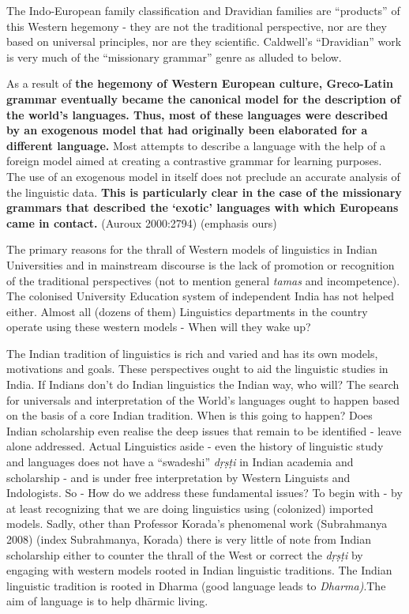 The Indo-European family classification and Dravidian families are “products” of this Western hegemony - they are not the traditional perspective, nor are they based on universal principles, nor are they scientific. Caldwell’s “Dravidian” work is very much of the “missionary grammar” genre as alluded to below.

\begin{myquote}
As a result of \textbf{the hegemony of Western European culture, Greco-Latin grammar eventually became the canonical model for the description of the world’s languages. Thus, most of these languages were described by an exogenous model that had originally been elaborated for a different language.} Most attempts to describe a language with the help of a foreign model aimed at creating a contrastive grammar for learning purposes. The use of an exogenous model in itself does not preclude an accurate analysis of the linguistic data. \textbf{This is particularly clear in the case of the missionary grammars that described the ‘exotic’ languages with which Europeans came in contact.} (Auroux 2000:2794) (emphasis ours)
\end{myquote}

The primary reasons for the thrall of Western models of linguistics in Indian Universities and in mainstream discourse is the lack of promotion or recognition of the traditional perspectives (not to mention general \textit{tamas} and incompetence). The colonised University Education system of independent India has not helped either. Almost all (dozens of them) Linguistics departments in the country operate using these western models - When will they wake up?

The Indian tradition of linguistics is rich and varied and has its own models, motivations and goals. These perspectives ought to aid the linguistic studies in India. If Indians don’t do Indian linguistics the Indian way, who will? The search for universals and interpretation of the World’s languages ought to happen based on the basis of a core Indian tradition. When is this going to happen? Does Indian scholarship even realise the deep issues that remain to be identified - leave alone addressed. Actual Linguistics aside - even the history of linguistic study and languages does not have a “swadeshi” \textit{dṛṣṭi} in Indian academia and scholarship - and is under free interpretation by Western Linguists and Indologists. So - How do we address these fundamental issues? To begin with - by at least recognizing that we are doing linguistics using (colonized) imported models. Sadly, other than Professor Korada’s phenomenal work (Subrahmanya 2008) (index Subrahmanya, Korada) there is very little of note from Indian scholarship either to counter the thrall of the West or correct the \textit{dṛṣṭi} by engaging with western models rooted in Indian linguistic traditions. The Indian linguistic tradition is rooted in Dharma (good language leads to \textit{Dharma)}.The aim of language is to help dhārmic living.


